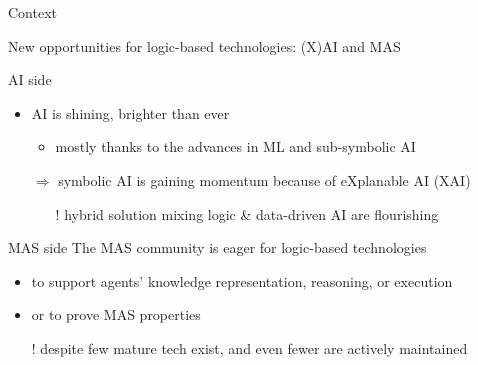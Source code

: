 \documentclass[presentation]{beamer}
\begin{document}
\begin{frame}[c]{Context}
	
	New opportunities for logic-based technologies: (X)AI and MAS
	
	\vfill

    \begin{block}{AI side}
        \begin{itemize}
            \item AI is shining, brighter than ever
            \begin{itemize}
                \item mostly thanks to the advances in ML and sub-symbolic AI
            \end{itemize}

            \item[$\Rightarrow$] symbolic AI is gaining momentum because of eXplanable AI (XAI)
            \begin{itemize}
                \item[!] hybrid solution mixing logic \& data-driven AI are flourishing 
            \end{itemize}
        \end{itemize}
    \end{block}

	\vfill

    \begin{block}{MAS side}
        The MAS community is eager for logic-based technologies 
        \begin{itemize}
            \item to support agents' knowledge representation, reasoning, or execution

            \item or to prove MAS properties

            \item[!] despite few mature tech exist, and even fewer are actively maintained
        \end{itemize}
    \end{block}
\end{frame}
\end{document}

